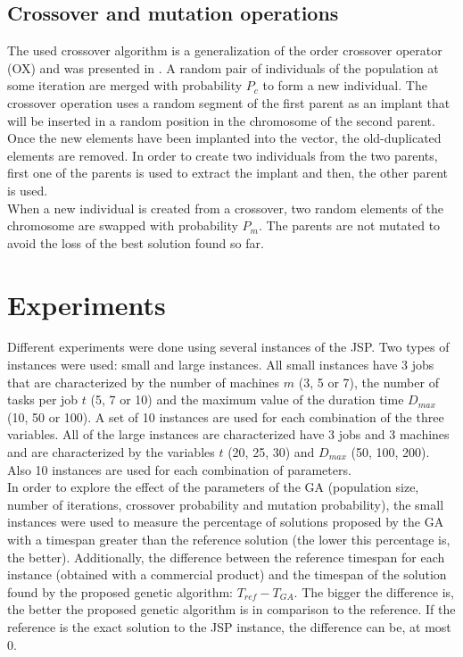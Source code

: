 \documentclass[10pt,a4paper]{article}
\begin{document}
\subsection{Crossover and mutation operations}
The used crossover algorithm is a generalization of the order crossover operator (OX) and was presented in \cite{bierwirth1995generalized}. A random pair of individuals of the population at some iteration are merged with probability $P_c$ to form a new individual. The crossover operation uses a random segment of the first parent as an implant that will be inserted in a random position in the chromosome of the second parent. Once the new elements have been implanted into the vector, the old-duplicated elements are removed. In order to create two individuals from the two parents, first one of the parents is used to extract the implant and then, the other parent is used.\\

When a new individual is created from a crossover, two random elements of the chromosome are swapped with probability $P_m$. The parents are not mutated to avoid the loss of the best solution found so far. 

\section{Experiments}
Different experiments were done using several instances of the JSP. Two types of instances were used: small and large instances. All small instances have 3 jobs that are characterized by the number of machines $m$ (3, 5 or 7), the number of tasks per job $t$ (5, 7 or 10) and the maximum value of the duration time $D_{max}$ (10, 50 or 100). A set of 10 instances are used for each combination of the three variables. All of the large instances are characterized have 3 jobs and 3 machines and are characterized by the variables $t$ (20, 25, 30) and $D_{max}$ (50, 100, 200). Also 10 instances are used for each combination of parameters.\\

In order to explore the effect of the parameters of the GA (population size, number of iterations, crossover probability and mutation probability), the small instances were used to measure the percentage of solutions proposed by the GA with a timespan greater than the reference solution (the lower this percentage is, the better). Additionally, the difference between the reference timespan for each instance (obtained with a commercial product) and the timespan of the solution found by the proposed genetic algorithm: $T_{ref} - T_{GA}$. The bigger the difference is, the better the proposed genetic algorithm is in comparison to the reference. If the reference is the exact solution to the JSP instance, the difference can be, at most 0.\\
\end{document}
